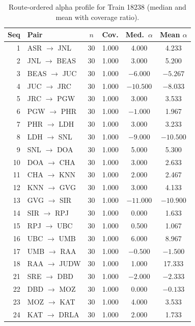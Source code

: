 \documentclass[a4paper,fleqn]{cas-dc}
\begin{document}
\begin{table}[width=\textwidth,pos=t]
\caption{Route-ordered alpha profile for Train 18238 (median and mean with
coverage ratio).}
\label{tab:route_alpha}
\setlength{\tabcolsep}{4pt}
\renewcommand{\arraystretch}{0.85}
\footnotesize
\begin{tabular*}{\tblwidth}{@{\extracolsep{\fill}}r l c c c c@{}}
\toprule
Seq & Pair & $n$ & Cov. & Med.\ $\alpha$ & Mean $\alpha$ \\
\midrule
1  & ASR $\to$ JNL  & 30 & 1.000 &   4.000 &   4.233 \\
2  & JNL $\to$ BEAS & 30 & 1.000 &   3.000 &   5.200 \\
3  & BEAS $\to$ JUC & 30 & 1.000 &  $-6.000$ &  $-5.267$ \\
4  & JUC $\to$ JRC  & 30 & 1.000 & $-10.500$ &  $-8.033$ \\
5  & JRC $\to$ PGW  & 30 & 1.000 &   3.000 &   3.533 \\
6  & PGW $\to$ PHR  & 30 & 1.000 &  $-1.000$ &   1.967 \\
7  & PHR $\to$ LDH  & 30 & 1.000 &   3.000 &   3.233 \\
8  & LDH $\to$ SNL  & 30 & 1.000 &  $-9.000$ & $-10.500$ \\
9  & SNL $\to$ DOA  & 30 & 1.000 &   5.000 &   5.300 \\
10 & DOA $\to$ CHA  & 30 & 1.000 &   3.000 &   2.633 \\
11 & CHA $\to$ KNN  & 30 & 1.000 &   2.000 &   2.467 \\
12 & KNN $\to$ GVG  & 30 & 1.000 &   3.000 &   4.133 \\
13 & GVG $\to$ SIR  & 30 & 1.000 & $-11.000$ & $-10.900$ \\
14 & SIR $\to$ RPJ  & 30 & 1.000 &   0.000 &   1.633 \\
15 & RPJ $\to$ UBC  & 30 & 1.000 &   0.500 &   1.067 \\
16 & UBC $\to$ UMB  & 30 & 1.000 &   6.000 &   8.967 \\
17 & UMB $\to$ RAA  & 30 & 1.000 &  $-0.500$ &  $-1.500$ \\
18 & RAA $\to$ JUDW & 30 & 1.000 &   1.000 &  17.333 \\
21 & SRE $\to$ DBD  & 30 & 1.000 &  $-2.000$ &  $-2.333$ \\
22 & DBD $\to$ MOZ  & 30 & 1.000 &   0.000 &  $-0.133$ \\
23 & MOZ $\to$ KAT  & 30 & 1.000 &   4.000 &   3.533 \\
24 & KAT $\to$ DRLA & 30 & 1.000 &   2.000 &   1.733 \\

\end{tabular*}
\end{table}
\end{document}
